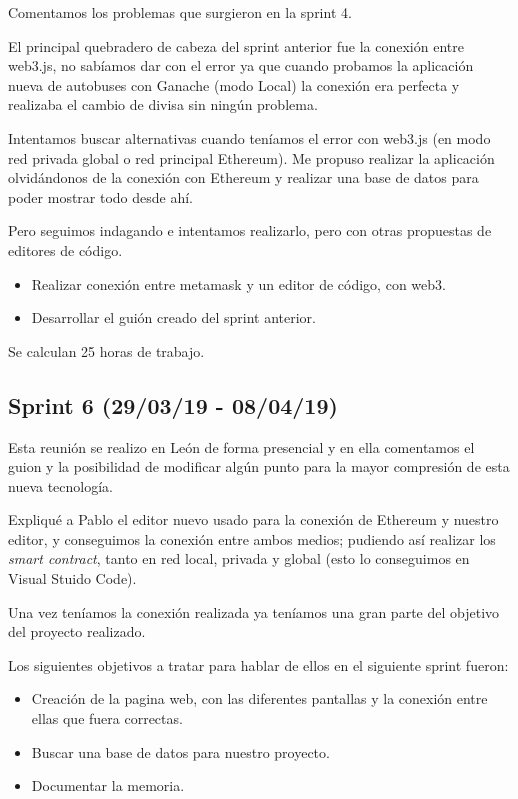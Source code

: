 Comentamos los problemas que surgieron en la sprint 4.

El principal quebradero de cabeza del sprint anterior fue la conexión entre web3.js, no sabíamos dar con el error ya que cuando probamos la aplicación nueva de autobuses con Ganache (modo Local) la conexión era perfecta y realizaba el cambio de divisa sin ningún problema.

Intentamos buscar alternativas cuando teníamos el error con web3.js (en modo red privada global o red principal Ethereum). Me propuso realizar la aplicación olvidándonos de la conexión con Ethereum y realizar una base de datos para poder mostrar todo desde ahí.

Pero seguimos indagando e intentamos realizarlo, pero con otras propuestas de editores de código.

\begin{itemize}
	\item Realizar conexión entre metamask y un editor de código, con web3.
	\item Desarrollar el guión creado del sprint anterior.
\end{itemize}

Se calculan 25 horas de trabajo.

\subsection{Sprint 6 (29/03/19 - 08/04/19)}

Esta reunión se realizo en León de forma presencial y en ella comentamos el guion y la posibilidad de modificar algún punto para la mayor compresión de esta nueva tecnología.

Expliqué a Pablo el editor nuevo usado para la conexión de Ethereum y nuestro editor, y conseguimos la conexión entre ambos medios; pudiendo así realizar los \textit{smart contract}, tanto en red local, privada y global (esto lo conseguimos en Visual Stuido Code).

Una vez teníamos la conexión realizada ya teníamos una gran parte del objetivo del proyecto realizado.

Los siguientes objetivos a tratar para hablar de ellos en el siguiente sprint fueron:

\begin{itemize}
	\item Creación de la pagina web, con las diferentes pantallas y la conexión entre ellas que fuera correctas.
	\item Buscar una base de datos para nuestro proyecto. 
	\item Documentar la memoria.
\end{itemize}

